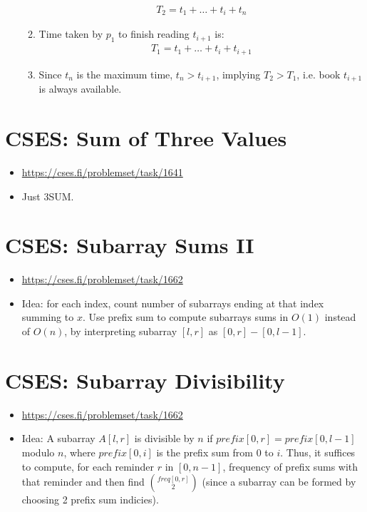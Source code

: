 \documentclass[titlepage, 12pt]{book}
\begin{document}
\begin{itemize}
\begin{enumerate}
\begin{align*}
                    T_2 = t_1 + \dots + t_i + t_n
                \end{align*}
            \item Time taken by $p_1$ to finish reading $t_{i + 1}$ is:
                \begin{align*}
                    T_1 = t_1 + \dots + t_i + t_{i + 1}
                \end{align*}
            \item Since $t_n$ is the maximum time, $t_n > t_{i + 1}$, implying
                $T_2 > T_1$, i.e. book $t_{i + 1}$ is always available.
        \end{enumerate}
\end{itemize}

\section{CSES: Sum of Three Values}
\begin{itemize}
    \item \url{https://cses.fi/problemset/task/1641}
    \item Just 3SUM.
\end{itemize}
\section{CSES: Subarray Sums II}
\begin{itemize}
    \item\url{https://cses.fi/problemset/task/1662}
    \item Idea: for each index, count number of subarrays ending at that index
        summing to $x$. Use prefix sum to compute subarrays sums in $O(1)$
        instead of $O(n)$, by interpreting subarray $[l, r]$ as $[0, r] - [0, l
        - 1]$.
\end{itemize}

\section{CSES: Subarray Divisibility}
\begin{itemize}
    \item\url{https://cses.fi/problemset/task/1662}
    \item Idea: A subarray $A[l, r]$ is divisible by $n$ if $prefix[0, r] =
        prefix[0, l - 1]$ modulo $n$, where $prefix[0, i]$ is the prefix sum
        from 0 to $i$. Thus, it suffices to compute, for each reminder $r$ in
        $[0, n - 1]$, frequency of prefix sums with that reminder and then find
        $\binom{freq[0, r]}{2}$ (since a subarray can be formed by choosing 2
        prefix sum indicies).
\end{itemize}
\end{document}
